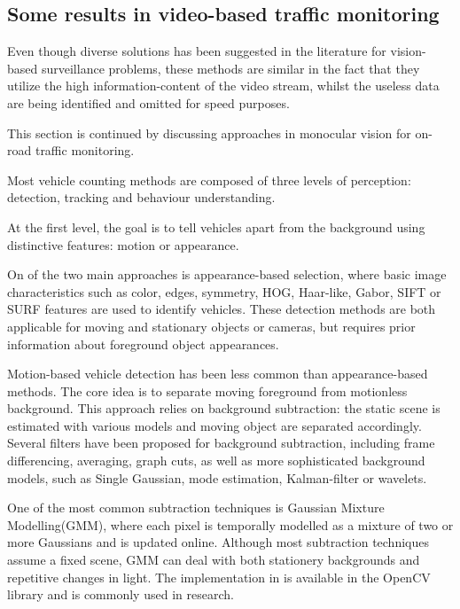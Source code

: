 \subsection{Some results in video-based traffic monitoring}
Even though diverse solutions has been suggested in the literature for vision-based surveillance problems, these methods are similar in the fact that they utilize the high information-content of the video stream, whilst the useless data are being identified and omitted for speed purposes.

This section is continued by discussing approaches in monocular vision for on-road traffic monitoring.

Most vehicle counting methods are composed of three levels of perception: detection, tracking and behaviour understanding.

At the first level, the goal is to tell vehicles apart from the background using distinctive features: motion or appearance.

On of the two main approaches is appearance-based selection, where basic image characteristics such as color\cite{Chang2005}, edges\cite{Blanc2007}, symmetry\cite{Aytekin2010}, HOG\cite{TehraniNiknejad2012}, Haar-like\cite{Sivaraman2012}, Gabor\cite{Zhang2006}, SIFT\cite{Zhang2011} or SURF\cite{Lin2012} features are used to identify vehicles.
These detection methods are both applicable for moving and stationary objects or cameras, but requires prior information about foreground object appearances.

Motion-based vehicle detection has been less common than appearance-based methods.
The core idea is to separate moving foreground from motionless background.
This approach relies on background subtraction: the static scene is estimated with various models and moving object are separated accordingly.
Several filters have been proposed for background subtraction, including frame differencing\cite{Park2007}, averaging\cite{Kanhere2008}, graph cuts\cite{Woodford2009}, as well as more sophisticated background models, such as Single Gaussian\cite{Kumar2003}, mode estimation\cite{Zheng2006}, Kalman-filter\cite{Messelodi2005} or wavelets\cite{Gao2009}. 

One of the most common subtraction techniques is Gaussian Mixture Modelling(GMM)\cite{Niknejad2012, Wang2009,Zhang2016a}, where each pixel is temporally modelled as a mixture of two or more Gaussians and is updated online\cite{Stauffer1999,Stauffer2000}.
Although most subtraction techniques assume a fixed scene, GMM can deal with both stationery backgrounds and repetitive changes in light.
The implementation in \cite{Kaewtrakulpong2001} is available in the OpenCV library and is commonly used in research\cite{OpenCVMog2}.

